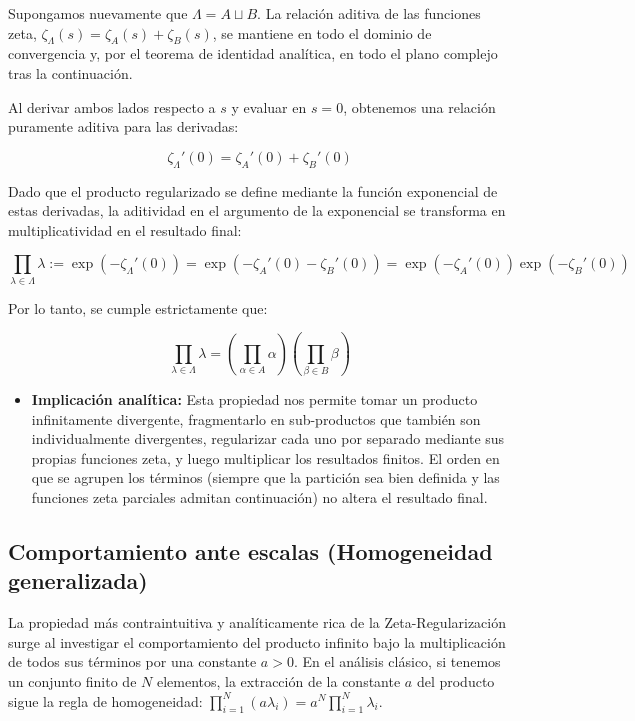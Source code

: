Supongamos nuevamente que $\Lambda = A \sqcup B$. La relación aditiva de las funciones zeta, $\zeta_\Lambda(s) = \zeta_A(s) + \zeta_B(s)$, se mantiene en todo el dominio de convergencia y, por el teorema de identidad analítica, en todo el plano complejo tras la continuación. 

Al derivar ambos lados respecto a $s$ y evaluar en $s=0$, obtenemos una relación puramente aditiva para las derivadas:

$$ \zeta_\Lambda'(0) = \zeta_A'(0) + \zeta_B'(0) $$

Dado que el producto regularizado se define mediante la función exponencial de estas derivadas, la aditividad en el argumento de la exponencial se transforma en multiplicatividad en el resultado final:

$$ \prod_{\lambda \in \Lambda} \lambda := \exp(-\zeta_\Lambda'(0)) = \exp(-\zeta_A'(0) - \zeta_B'(0)) = \exp(-\zeta_A'(0)) \exp(-\zeta_B'(0)) $$

Por lo tanto, se cumple estrictamente que:

$$ \prod_{\lambda \in \Lambda} \lambda = \left( \prod_{\alpha \in A} \alpha \right) \left( \prod_{\beta \in B} \beta \right) $$

\begin{itemize}
    \item \textbf{Implicación analítica:} Esta propiedad nos permite tomar un producto infinitamente divergente, fragmentarlo en sub-productos que también son individualmente divergentes, regularizar cada uno por separado mediante sus propias funciones zeta, y luego multiplicar los resultados finitos. El orden en que se agrupen los términos (siempre que la partición sea bien definida y las funciones zeta parciales admitan continuación) no altera el resultado final.
\end{itemize}

\subsection{Comportamiento ante escalas (Homogeneidad generalizada)}

La propiedad más contraintuitiva y analíticamente rica de la Zeta-Regularización surge al investigar el comportamiento del producto infinito bajo la multiplicación de todos sus términos por una constante $a > 0$. En el análisis clásico, si tenemos un conjunto finito de $N$ elementos, la extracción de la constante $a$ del producto sigue la regla de homogeneidad: $\prod_{i=1}^N (a\lambda_i) = a^N \prod_{i=1}^N \lambda_i$. 

